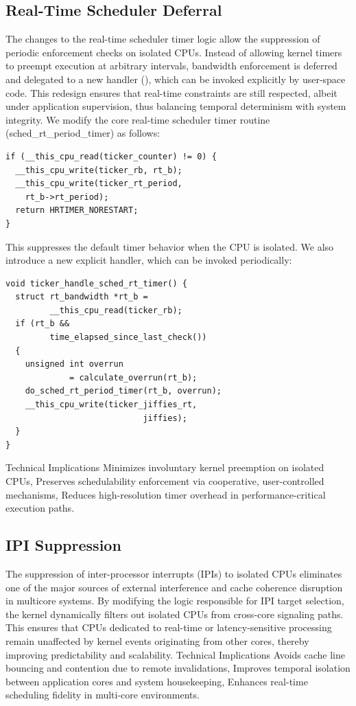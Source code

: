 \documentclass[letterpaper]{article}
\begin{document}
\subsection{Real-Time Scheduler Deferral}
The changes to the real-time scheduler timer logic allow the suppression of periodic enforcement
checks on isolated CPUs. Instead of allowing kernel timers to preempt execution at arbitrary
intervals, bandwidth enforcement is deferred and delegated to a new handler (), which can be
invoked explicitly by user-space code.
This redesign ensures that real-time constraints are still respected, albeit under application
supervision, thus balancing temporal determinism with system integrity.
We modify the core real-time scheduler timer routine (sched\_rt\_period\_timer) as follows:
\begin{verbatim}
if (__this_cpu_read(ticker_counter) != 0) {
  __this_cpu_write(ticker_rb, rt_b); 
  __this_cpu_write(ticker_rt_period,
    rt_b->rt_period);
  return HRTIMER_NORESTART;
}
\end{verbatim}
This suppresses the default timer behavior when the CPU is isolated.
We also introduce a new explicit handler, which can be invoked periodically:
\begin{verbatim}
void ticker_handle_sched_rt_timer() {
  struct rt_bandwidth *rt_b =
         __this_cpu_read(ticker_rb);
  if (rt_b &&
         time_elapsed_since_last_check())
  {
    unsigned int overrun
             = calculate_overrun(rt_b);
    do_sched_rt_period_timer(rt_b, overrun);
    __this_cpu_write(ticker_jiffies_rt,
                            jiffies);
  }
}
\end{verbatim}
Technical Implications
Minimizes involuntary kernel preemption on isolated CPUs,
Preserves schedulability enforcement via cooperative, user-controlled mechanisms,
Reduces high-resolution timer overhead in performance-critical execution paths.

\subsection{IPI Suppression}
The suppression of inter-processor interrupts (IPIs) to isolated CPUs eliminates one of the major
sources of external interference and cache coherence disruption in multicore systems. By
modifying the logic responsible for IPI target selection, the kernel dynamically filters out isolated
CPUs from cross-core signaling paths.
This ensures that CPUs dedicated to real-time or latency-sensitive processing remain unaffected
by kernel events originating from other cores, thereby improving predictability and scalability.
Technical Implications
Avoids cache line bouncing and contention due to remote invalidations,
Improves temporal isolation between application cores and system housekeeping,
Enhances real-time scheduling fidelity in multi-core environments.
\end{document}
